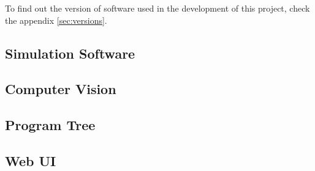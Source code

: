 To find out the version of software used in the development of this project, check the appendix \ref{sec:versions}.


\subsection{Simulation Software}
\label{subsec:simulation-software}



\subsection{Computer Vision}
\label{subsec:computer-vision}


\subsection{Program Tree}
\label{subsec:program-tree}


\subsection{Web UI}
\label{subsec:web-ui}
